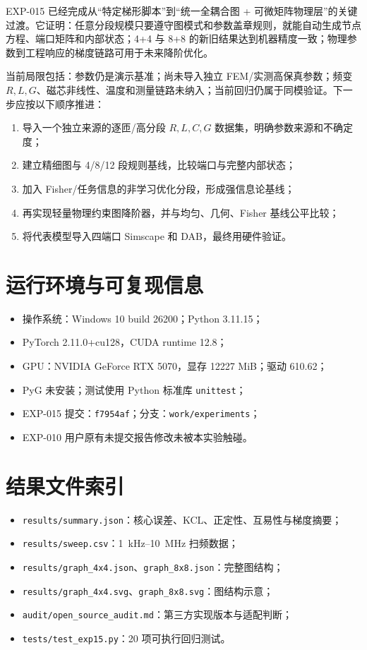 \documentclass[11pt,a4paper]{ctexart}
\newcommand{\code}[1]{\texttt{#1}}
\begin{document}
EXP-015 已经完成从“特定梯形脚本”到“统一全耦合图 + 可微矩阵物理层”的关键过渡。它证明：任意分段规模只要遵守图模式和参数盖章规则，就能自动生成节点方程、端口矩阵和内部状态；4+4 与 8+8 的新旧结果达到机器精度一致；物理参数到工程响应的梯度链路可用于未来降阶优化。

当前局限包括：参数仍是演示基准；尚未导入独立 FEM/实测高保真参数；频变 \(R,L,G\)、磁芯非线性、温度和测量链路未纳入；当前回归仍属于同模验证。下一步应按以下顺序推进：
\begin{enumerate}
  \item 导入一个独立来源的逐匝/高分段 \(R,L,C,G\) 数据集，明确参数来源和不确定度；
  \item 建立精细图与 4/8/12 段规则基线，比较端口与完整内部状态；
  \item 加入 Fisher/任务信息的非学习优化分段，形成强信息论基线；
  \item 再实现轻量物理约束图降阶器，并与均匀、几何、Fisher 基线公平比较；
  \item 将代表模型导入四端口 Simscape 和 DAB，最终用硬件验证。
\end{enumerate}

\appendix
\section{运行环境与可复现信息}

\begin{itemize}
\item 操作系统：Windows 10 build 26200；Python 3.11.15；
\item PyTorch 2.11.0+cu128，CUDA runtime 12.8；
\item GPU：NVIDIA GeForce RTX 5070，显存 12227 MiB；驱动 610.62；
\item PyG 未安装；测试使用 Python 标准库 \code{unittest}；
\item EXP-015 提交：\code{f7954af}；分支：\code{work/experiments}；
\item EXP-010 用户原有未提交报告修改未被本实验触碰。
\end{itemize}

\section{结果文件索引}

\begin{itemize}
\item \code{results/summary.json}：核心误差、KCL、正定性、互易性与梯度摘要；
\item \code{results/sweep.csv}：1~kHz--10~MHz 扫频数据；
\item \code{results/graph\_4x4.json}、\code{graph\_8x8.json}：完整图结构；
\item \code{results/graph\_4x4.svg}、\code{graph\_8x8.svg}：图结构示意；
\item \code{audit/open\_source\_audit.md}：第三方实现版本与适配判断；
\item \code{tests/test\_exp15.py}：20 项可执行回归测试。
\end{itemize}
\end{document}
